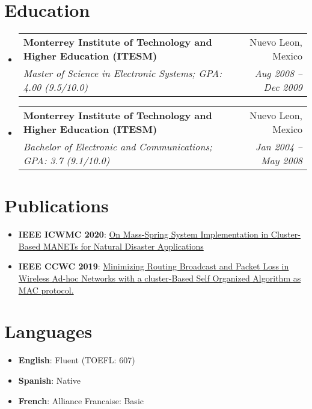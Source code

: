 \documentclass[letterpaper,11pt]{article}
\makeatletter
\newcommand{\resumeItem}[2]{
    \item\small{
        \textbf{#1}{: #2 \vspace{-2pt}}
    }
}
\newcommand{\resumeSubheading}[4]{
    \vspace{-1pt}\item
    \begin{tabular*}{0.97\textwidth}{l@{\extracolsep{\fill}}r}
        \textbf{#1} & #2 \\
        \textit{\small#3} & \textit{\small #4} \\
    \end{tabular*}\vspace{-5pt}
}
\newcommand{\resumeSubHeadingListStart}{\begin{itemize}[leftmargin=*]}
\newcommand{\resumeSubHeadingListEnd}{\end{itemize}}
\newcommand{\resumeItemListStart}{\begin{itemize}}
\newcommand{\resumeItemListEnd}{\end{itemize}\vspace{-5pt}}
\makeatother
\begin{document}
\section{Education}
\resumeSubHeadingListStart
\resumeSubheading
{Monterrey Institute of Technology and Higher Education (ITESM)}{Nuevo Leon, Mexico}
{Master of Science in Electronic Systems;  GPA: 4.00 (9.5/10.0)}{Aug 2008 -- Dec 2009}
\resumeSubheading
{Monterrey Institute of Technology and Higher Education (ITESM)}{Nuevo Leon, Mexico}
{Bachelor of Electronic and Communications;  GPA: 3.7 (9.1/10.0)}{Jan 2004 -- May 2008}
\resumeSubHeadingListEnd

%
\section{Publications}
\label{sec:Publications}
\resumeSubHeadingListStart
\resumeItem{IEEE ICWMC 2020}{\href{http://www.thinkmind.org/index.php?view=article&articleid=icwmc_2020_1_10_20034}{On Mass-Spring System Implementation in Cluster-Based MANETs for Natural Disaster Applications}}
\resumeItem{IEEE CCWC 2019}{\href{https://ieeexplore.ieee.org/document/8666583}{Minimizing Routing Broadcast and Packet Loss in Wireless Ad-hoc Networks with a cluster-Based Self Organized Algorithm as MAC protocol.}}
\resumeSubHeadingListEnd

%
\section{Languages}
\resumeSubHeadingListStart
\resumeItem{English}{Fluent (TOEFL: 607)}
\resumeItem{Spanish}{Native}
\resumeItem{French}{Alliance Francaise: Basic}
\resumeSubHeadingListEnd
\end{document}
